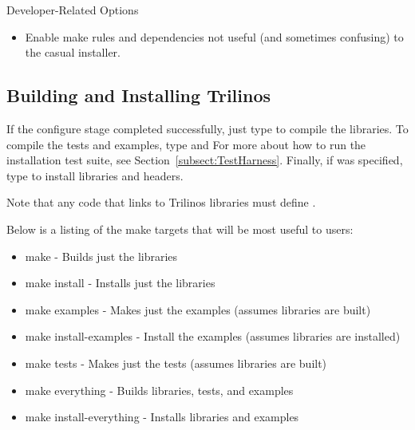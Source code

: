 Developer-Related Options
\begin{itemize}
\item {}

Enable make rules and dependencies not useful (and sometimes confusing) to
the casual installer.
\end{itemize}

\subsection{Building and Installing Trilinos}
\label{Subsection:BuildingTrilinos}

If the configure stage completed successfully, just type 
to compile the libraries.  To compile the tests and examples, type
 and   For more
about how to run the installation test suite, see Section~\ref{subsect:TestHarness}.
Finally, if  was specified, type 
to install libraries and headers.

\begin{minipage}[c]{\textwidth}

\begin{minipage}[l]{.6\textwidth}

Note that any code that links to Trilinos libraries must define
.
\end{minipage}\hfill
{}
\end{minipage}

Below is a listing of the make targets that will be most useful to users:

\begin{itemize}
\item make - Builds just the libraries
\item make install - Installs just the libraries
\item make examples - Makes just the examples (assumes libraries are built)
\item make install-examples - Install the examples (assumes libraries are installed)
\item make tests - Makes just the tests (assumes libraries are built)
\item make everything - Builds libraries, tests, and examples
\item make install-everything - Installs libraries and examples
\end{itemize}

